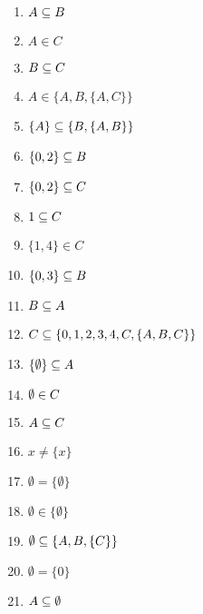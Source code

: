 \documentclass[12pt]{exam}
\begin{document}
    \begin{multicols}{2}
        \begin{enumerate}[label={\arabic*})]
            \item $A \subseteq B$

            \item $A \in C$

            \item $B \subseteq C$

            \item $A \in \{A, B, \{A, C\}\}$

            \item $\{A\} \subseteq \{B, \{A, B\}\}$

            \item $\{0,2\} \subseteq B$

            \item $\{0,2\} \subseteq C$

            \item $1 \subseteq C$

            \item $\{1,4\} \in C$

            \item $\{0,3\} \subseteq B$

            \item $B \subseteq A$

            \item $C \subseteq \{0, 1, 2, 3, 4, C, \{A, B, C\}\}$

            \item $\{\emptyset\} \subseteq A$

            \item $\emptyset \in C$

            \item $A \subseteq C$

            \item $x \neq \{x\}$

            \item $\emptyset = \{\emptyset\}$

            \item $\emptyset \in \{\emptyset\}$

            \item $\emptyset \subseteq \{A, B, \{C\}\}$

            \item $\emptyset = \{0\}$

            \item $A \subseteq \emptyset$


\end{enumerate}
\end{multicols}
\end{document}

